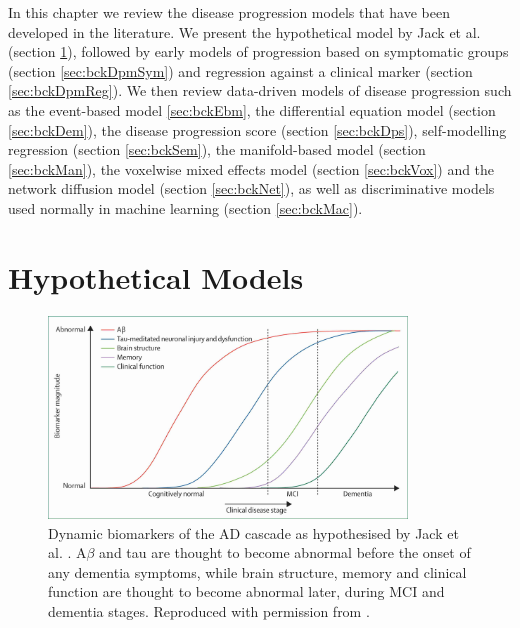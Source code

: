In this chapter we review the disease progression models that have been developed in the literature. We present the hypothetical model by Jack et al. \cite{jack2010hypothetical} (section \ref{sec:bckDpmHyp}), followed by early models of progression based on symptomatic groups (section \ref{sec:bckDpmSym}) and regression against a clinical marker (section \ref{sec:bckDpmReg}). We then review data-driven models of disease progression such as the event-based model \ref{sec:bckEbm}, the differential equation model (section \ref{sec:bckDem}), the disease progression score (section \ref{sec:bckDps}), self-modelling regression (section \ref{sec:bckSem}), the manifold-based model (section \ref{sec:bckMan}), the voxelwise mixed effects model (section \ref{sec:bckVox}) and the network diffusion model (section \ref{sec:bckNet}), as well as discriminative models used normally in machine learning (section \ref{sec:bckMac}).

\section{Hypothetical Models}
\label{sec:bckDpmHyp}

\begin{figure}
 \centering
 \includegraphics[width=0.85\textwidth,trim=5 5 5 5,clip]{images/jackCurves}
 \caption[Biomarker cascade by Jack et al. \cite{jack2010hypothetical}]{Dynamic biomarkers of the AD cascade as hypothesised by Jack et al. \cite{jack2010hypothetical}. A$\beta$ and tau are thought to become abnormal before the onset of any dementia symptoms, while brain structure, memory and clinical function are thought to become abnormal later, during MCI and dementia stages. Reproduced with permission from \cite{jack2010hypothetical}.}
 \label{fig:biomk_cascade}
\end{figure}


